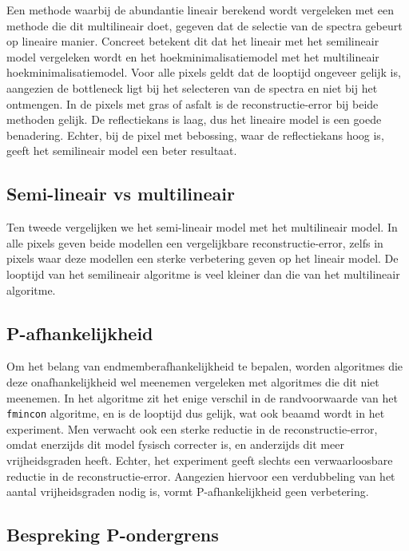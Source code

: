\documentclass[12pt]{report}
\begin{document}
Een methode waarbij de abundantie lineair berekend wordt vergeleken met een methode die dit multilineair doet, gegeven dat de selectie van de spectra gebeurt op lineaire manier. Concreet betekent dit dat het lineair met het semilineair model vergeleken wordt en het hoekminimalisatiemodel met het multilineair hoekminimalisatiemodel. Voor alle pixels geldt dat de looptijd ongeveer gelijk is, aangezien de bottleneck ligt bij het selecteren van de spectra en niet bij het ontmengen. In de pixels met gras of asfalt is de reconstructie-error bij beide methoden gelijk. De reflectiekans is laag, dus het lineaire model is een goede benadering. Echter, bij de pixel met bebossing, waar de reflectiekans hoog is, geeft het semilineair model een beter resultaat.


\subsection{Semi-lineair vs multilineair}

Ten tweede vergelijken we het semi-lineair model met het multilineair model. In alle pixels geven beide modellen een vergelijkbare reconstructie-error, zelfs in pixels waar deze modellen een sterke verbetering geven op het lineair model. De looptijd van het semilineair algoritme is veel kleiner dan die van het multilineair algoritme. 

\subsection{P-afhankelijkheid}

Om het belang van endmemberafhankelijkheid te bepalen, worden algoritmes die deze onafhankelijkheid wel meenemen vergeleken met algoritmes die dit niet meenemen. In het algoritme zit het enige verschil in de randvoorwaarde van het \texttt{fmincon} algoritme, en is de looptijd dus gelijk, wat ook beaamd wordt in het experiment. Men verwacht ook een sterke reductie in de reconstructie-error, omdat enerzijds dit model fysisch correcter is, en anderzijds dit meer vrijheidsgraden heeft. Echter, het experiment geeft slechts een verwaarloosbare reductie in de reconstructie-error. Aangezien hiervoor een verdubbeling van het aantal vrijheidsgraden nodig is, vormt P-afhankelijkheid geen verbetering.

\subsection{Bespreking P-ondergrens}
\end{document}

